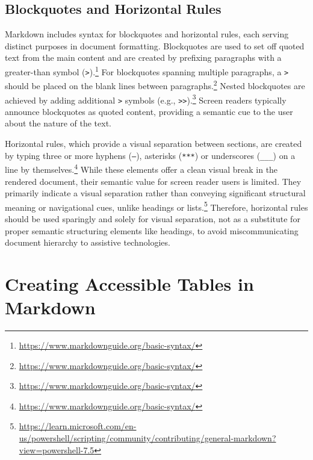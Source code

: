 \subsection{Blockquotes and Horizontal Rules}
Markdown includes syntax for blockquotes and horizontal rules, each serving distinct purposes in document formatting. Blockquotes are used to set off quoted text from the main content and are created by prefixing paragraphs with a greater-than symbol (\texttt{>}).\footnote{\url{https://www.markdownguide.org/basic-syntax/}} For blockquotes spanning multiple paragraphs, a \texttt{>} should be placed on the blank lines between paragraphs.\footnote{\url{https://www.markdownguide.org/basic-syntax/}} Nested blockquotes are achieved by adding additional \texttt{>} symbols (e.g., \texttt{>>}).\footnote{\url{https://www.markdownguide.org/basic-syntax/}} Screen readers typically announce blockquotes as quoted content, providing a semantic cue to the user about the nature of the text.

Horizontal rules, which provide a visual separation between sections, are created by typing three or more hyphens (\texttt{---}), asterisks (\texttt{***}) or underscores (\texttt{\_\_\_}) on a line by themselves.\footnote{\url{https://www.markdownguide.org/basic-syntax/}} While these elements offer a clean visual break in the rendered document, their semantic value for screen reader users is limited. They primarily indicate a visual separation rather than conveying significant structural meaning or navigational cues, unlike headings or lists.\footnote{\url{https://learn.microsoft.com/en-us/powershell/scripting/community/contributing/general-markdown?view=powershell-7.5}} Therefore, horizontal rules should be used sparingly and solely for visual separation, not as a substitute for proper semantic structuring elements like headings, to avoid miscommunicating document hierarchy to assistive technologies.

\section{Creating Accessible Tables in Markdown}
\label{sec:markdown-tables}

